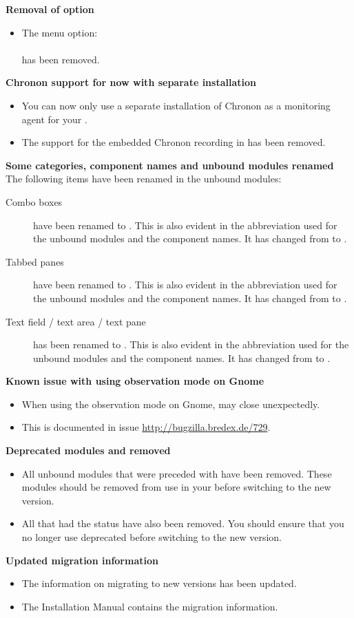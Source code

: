 \textbf{Removal of option }
\begin{itemize}
\item The menu option: \\
\\
has been removed.
\end{itemize}

\textbf{Chronon support for \gdauts{} now with separate installation}
\begin{itemize}
\item You can now only use a separate installation of Chronon as a monitoring agent for your \gdaut{}. 
\item The support for the embedded Chronon recording in \gdauts{} has been removed.
\end{itemize}

\textbf{Some categories, component names and unbound modules renamed}
The following items have been renamed in the unbound modules:
\begin{description}
\item [Combo boxes]{ have been renamed to . This is also evident in the abbreviation used for the unbound modules and the component names. It has changed from  to .}
\item [Tabbed panes]{ have been renamed to . This is also evident in the abbreviation used for the unbound modules and the component names. It has changed from  to .}
\item [Text field / text area / text pane]{ has been renamed to . This is also evident in the abbreviation used for the unbound modules and the component names. It has changed from  to .}
\end{description}

\textbf{Known issue with using observation mode on Gnome}
\begin{itemize}
\item When using the observation mode on Gnome, \app{} may close unexpectedly. 
\item This is documented in issue \url{http://bugzilla.bredex.de/729}.
\end{itemize}

\textbf{Deprecated modules and \gdsteps{} removed}
\begin{itemize}
\item All unbound modules that were preceded with  have been removed. These modules should be removed from use in your \gdprojects{} before switching to the new version. 
\item All \gdsteps{} that had the status  have also been removed. You should ensure that you no longer use deprecated \gdsteps{} before switching to the new version. 
\end{itemize}

\textbf{Updated migration information}
\begin{itemize}
\item The information on migrating to new versions has been updated.
\item The Installation Manual contains the migration information. 
\end{itemize}
